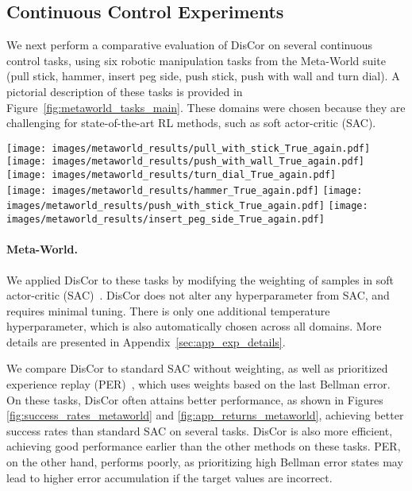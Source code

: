 \documentclass[jmlr]{article}
\begin{document}
\subsection{Continuous Control Experiments}
\label{sec:continuous_control}
We next perform a comparative evaluation of DisCor on several continuous control tasks, using six robotic manipulation tasks from the Meta-World suite (pull stick, hammer, insert peg side, push stick, push with wall and turn dial). A pictorial description of these tasks is provided in Figure~\ref{fig:metaworld_tasks_main}. These domains were chosen because they are challenging for state-of-the-art RL methods, such as soft actor-critic (SAC).

\begin{figure*}[t!]
    \centering
    \texttt{[image: images/metaworld\_results/pull\_with\_stick\_True\_again.pdf]}
    \texttt{[image: images/metaworld\_results/push\_with\_wall\_True\_again.pdf]}
    \texttt{[image: images/metaworld\_results/turn\_dial\_True\_again.pdf]} \\
    \texttt{[image: images/metaworld\_results/hammer\_True\_again.pdf]}
    \texttt{[image: images/metaworld\_results/push\_with\_stick\_True\_again.pdf]}
    \texttt{[image: images/metaworld\_results/insert\_peg\_side\_True\_again.pdf]}
    \caption{\footnotesize{Evaluation success of DisCor, unweighted SAC and PER on six MetaWorld tasks. From left to right: pull stick, push with wall, push stick, turn dial, hammer and insert peg side. Note that DisCor achieves better final success rates or learns faster on most of the tasks. }}
    \label{fig:success_rates_metaworld}
\end{figure*}

\paragraph{Meta-World.} We applied DisCor to these tasks by modifying the weighting of samples in soft actor-critic (SAC)~\cite{Haarnoja18}. DisCor does not alter any hyperparameter from SAC, and requires minimal tuning.
There is only one additional temperature hyperparameter, which is also automatically chosen across all domains.
More details are presented in Appendix~\ref{sec:app_exp_details}.  





We compare DisCor to standard SAC without weighting, as well as prioritized experience replay (PER)~\cite{Schaul2015}, which uses weights based on the last Bellman error. On these tasks, DisCor often attains better performance, as shown in Figures \ref{fig:success_rates_metaworld} and \ref{fig:app_returns_metaworld}, achieving better success rates than standard SAC on several tasks. 
DisCor is also more efficient, achieving good performance earlier than the other methods on these tasks. PER, on the other hand, performs poorly, as prioritizing high Bellman error states may lead to higher error accumulation if the target values are incorrect. 
\end{document}
